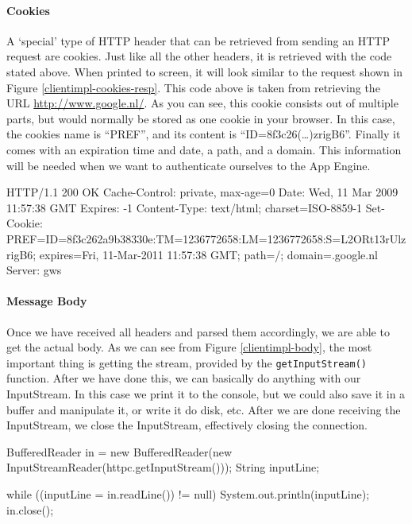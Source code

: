 \paragraph{Cookies}
\label{clientimpl-cookies}
A `special' type of HTTP header that can be retrieved from sending an HTTP
request are cookies. Just like all the other headers, it is retrieved with the
code stated above. When printed to screen, it will look similar to the request
shown in Figure \ref{clientimpl-cookies-resp}. This code above is taken from
retrieving the URL \url{http://www.google.nl/}. As you can see, this cookie
consists out of multiple parts, but would normally be stored as one cookie in your
browser. In this case, the cookies name is ``PREF'', and its content is
``ID=8f3c26(\ldots)zrigB6''. Finally it comes with an expiration time and date,
a path, and a domain. This information will be needed when we want to authenticate
ourselves to the App Engine.

\begin{figure*}[ht] %
\begin{center}
\begin{code}
HTTP/1.1 200 OK
Cache-Control: private, max-age=0
Date: Wed, 11 Mar 2009 11:57:38 GMT
Expires: -1
Content-Type: text/html; charset=ISO-8859-1
Set-Cookie: 
  PREF=ID=8f3c262a9b38330e:TM=1236772658:LM=1236772658:S=L2ORt13rUlzrigB6; 
  expires=Fri, 11-Mar-2011 11:57:38 GMT; path=/; domain=.google.nl
Server: gws
\end{code}
\caption{An HTTP response including cookies.\label{clientimpl-cookies-resp}}
\end{center}
\end{figure*}

\paragraph{Message Body}
Once we have received all headers and parsed them accordingly, we are able to
get the actual body. As we can see from Figure \ref{clientimpl-body}, the most
important thing is getting the stream, provided by the \texttt{getInputStream()}
function. After we have done this, we can basically do anything with our
InputStream. In this case we print it to the console, but we could also save it
in a buffer and manipulate it, or write it do disk, etc. After we are done
receiving the InputStream, we close the InputStream, effectively closing the
connection.

\begin{figure*}[ht] %
\begin{center}
\begin{code}
BufferedReader in = 
  new BufferedReader(new InputStreamReader(httpc.getInputStream()));
String inputLine;

while ((inputLine = in.readLine()) != null) {
    System.out.println(inputLine);
}
in.close();
\end{code}
\caption{Retrieving the HTTP response's body.\label{clientimpl-body}}
\end{center}
\end{figure*}

